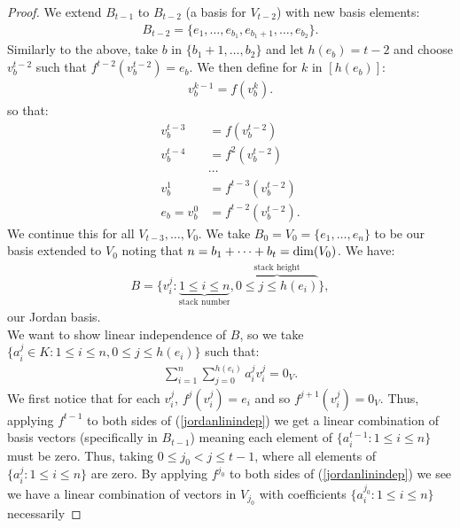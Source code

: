 \begin{proof}
    We extend $B_{t - 1}$ to $B_{t - 2}$
    (a basis for $V_{t - 2}$) with new basis elements: \begin{gather*}
        B_{t - 2} = \{e_1, \ldots, e_{b_1}, e_{b_1 + 1}, \ldots, e_{b_2}\}.
    \end{gather*} 
    Similarly to the above, take $b$ in $\{b_1 + 1, \ldots, b_2\}$ and
    let $h(e_b) = t - 2$ and choose $v_b^{t - 2}$ such that
    $f^{t - 2}(v_b^{t - 2}) = e_b$. We then define for $k$ in $[h(e_b)]$: 
    \begin{gather*}
        v_b^{k - 1} = f(v_b^k).
    \end{gather*} so that: \begin{align*}
        v_b^{t - 3} &= f(v_b^{t - 2}) \\
        v_b^{t - 4} &= f^2(v_b^{t - 2}) \\
        &\cdots \\
        v_b^1 &= f^{t - 3}(v_b^{t - 2}) \\
        e_b = v_b^0 &= f^{t - 2}(v_b^{t - 2}).
    \end{align*} We continue this for all $V_{t - 3}, \ldots, {V_0}$.
    We take $B_0 = V_0 = \{e_1, \ldots, e_n\}$ to be our basis 
    extended to $V_0$ noting that $n = b_1 + \cdots + b_t = \operatorname{dim}(V_0)$. 
    We have: \begin{gather*}
        B = \{v_i^j : 
        \underbrace{1 \leq i \leq n}_\text{stack number}, 
        \overbrace{0 \leq j \leq h(e_i)}^\text{stack height}
        \},
    \end{gather*} our Jordan basis. 
    \\[\baselineskip]
    We want to show linear independence
    of $B$, so we take $\{a_i^j \in K : 1 \leq i \leq n, 0 \leq j \leq h(e_i)\}$
    such that: \begin{gather} \label{jordanlinindep}
        \sum_{i = 1}^{n} \sum_{j = 0}^{h(e_i)} a_i^j v_i^j = 0_V.
    \end{gather} We first notice that for each $v_i^j$, $f^{j}(v_i^j) = e_i$
    and so $f^{j + 1}(v_i^j) = 0_V$. Thus, applying $f^{t - 1}$ to both
    sides of (\ref{jordanlinindep}) we get a linear combination
    of basis vectors (specifically in $B_{t - 1}$) meaning each
    element of $\{a_i^{t - 1} : 1 \leq i \leq n\}$ must be zero.
    Thus, taking $0 \leq j_0 < j \leq t - 1$, where all elements
    of $\{a_i^j : 1 \leq i \leq n\}$ are zero. By applying
    $f^{j_0}$ to both sides of (\ref{jordanlinindep}) we see 
    we have a linear combination of vectors in $V_{j_0}$ with 
    coefficients $\{a_i^{j_0} : 1 \leq i \leq n\}$ necessarily

\end{proof}

